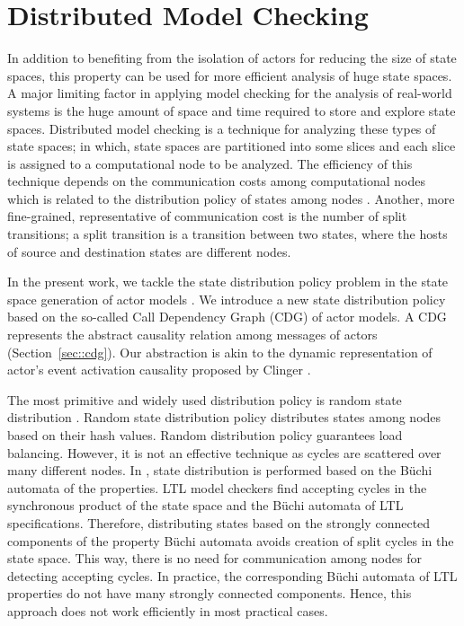 \section{Distributed Model Checking} \label{sec::DMC}
In addition to benefiting from the isolation of actors for reducing the size of state spaces, this property can be used for more efficient analysis of huge state spaces. A major limiting factor in applying model checking for the analysis of real-world systems is the huge amount of space and time required to store and explore state spaces. Distributed model checking is a technique for analyzing these types of state spaces; in which, state spaces are partitioned into some slices and each slice is assigned to a computational node to be analyzed. The efficiency of this technique depends on the communication costs among computational nodes which is related to the distribution policy of states among nodes \cite{DBLP:journals/entcs/OrzanPE05}. Another, more fine-grained, representative of communication cost is the number of split transitions; a split transition is a transition between two states,  where the hosts of source and destination states are different nodes. 

In the present work, we tackle the state distribution policy problem in the 
state space generation of actor models \cite{Hewitt72}. We introduce a new state distribution policy based on the so-called Call Dependency Graph (CDG) of actor models. A CDG represents the abstract causality relation among messages of actors (Section~\ref{sec::cdg}). Our abstraction is akin to the dynamic representation of actor's event activation causality proposed by Clinger \cite{clinger}. 

The most primitive and widely used distribution policy is random state distribution \cite{DBLP:journals/entcs/GaravelMS13,DBLP:journals/entcs/BarnatHR13,DBLP:journals/corr/abs-1111-0374,acceptingPredecessor}. Random state distribution policy distributes states among nodes based on their hash values. Random distribution policy guarantees load balancing. However, it is not an effective technique as cycles are scattered over many different nodes. In \cite{clusterBased}, state distribution is performed based on the B\"{u}chi automata of the properties. LTL model checkers find accepting cycles in the synchronous product of the state space and the B\"{u}chi automata of LTL specifications. Therefore, distributing states based on the strongly connected components of the property B\"{u}chi automata avoids creation of split cycles in the state space. This way, there is no need for communication among nodes for detecting accepting cycles. In practice, the corresponding B\"{u}chi automata of LTL properties do not have many strongly connected components. Hence, this approach does not work efficiently in most practical cases.


